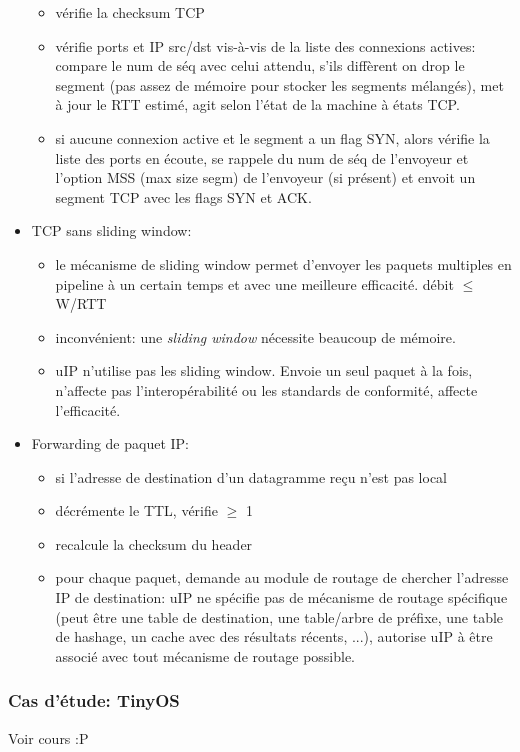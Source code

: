 \documentclass{article}
\begin{document}
\begin{sffamily}
\begin{itemize}
\begin{itemize}
  \item vérifie la checksum TCP
  \item vérifie ports et IP src/dst vis-à-vis de la liste
    des connexions actives: compare le num de séq avec celui attendu,
    s'ils diffèrent on drop le segment (pas assez de mémoire pour stocker
    les segments mélangés), met à jour le RTT estimé, agit selon l'état
    de la machine à états TCP.
  \item si aucune connexion active et le segment a un flag SYN, alors vérifie
    la liste des ports en écoute, se rappele du num de séq de l'envoyeur
    et l'option MSS (max size segm) de l'envoyeur (si présent) et
    envoit un segment TCP avec les flags SYN et ACK.
  \end{itemize}
\item TCP sans sliding window:
  \begin{itemize}
  \item le mécanisme de sliding window permet d'envoyer les paquets multiples
    en pipeline à un certain temps et avec une meilleure efficacité.
    débit $\leq$ W/RTT
  \item inconvénient: une \textit{sliding window} nécessite beaucoup de mémoire.
  \item uIP n'utilise pas les sliding window. Envoie un seul paquet à la fois,
    n'affecte pas l'interopérabilité ou les standards de conformité, affecte
    l'efficacité.
  \end{itemize}

\item Forwarding de paquet IP:
  \begin{itemize}
  \item si l'adresse de destination d'un datagramme reçu n'est pas local
  \item décrémente le TTL, vérifie $\geq$ 1
  \item recalcule la checksum du header
  \item pour chaque paquet, demande au module de routage de chercher
    l'adresse IP de destination: uIP ne spécifie pas de mécanisme de routage
    spécifique (peut être une table de destination, une table/arbre de préfixe,
    une table de hashage, un cache avec des résultats récents, ...),
    autorise uIP à être associé avec tout mécanisme de routage possible.
  \end{itemize}
\end{itemize}

\subsubsection{Cas d'étude: TinyOS}
Voir cours :P



\end{sffamily}
\end{document}
